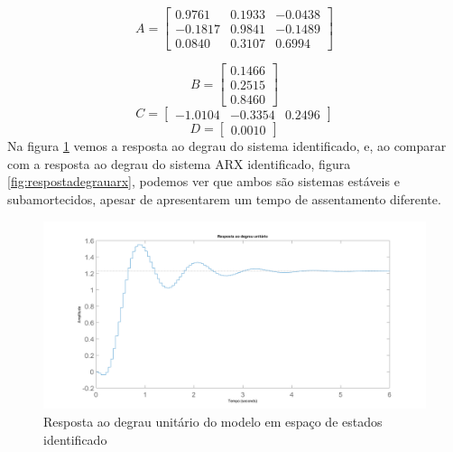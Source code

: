 \begin{equation}
A=\begin{bmatrix}
0.9761  &  0.1933 &  -0.0438\\
-0.1817  &  0.9841  & -0.1489\\
0.0840  &  0.3107  &  0.6994
\end{bmatrix}
\end{equation}

\begin{equation}
B=\begin{bmatrix}
0.1466\\
0.2515\\
0.8460
\end{bmatrix}
\end{equation}
\begin{equation}
C=\begin{bmatrix}
-1.0104 &  -0.3354 &   0.2496
\end{bmatrix}
\end{equation}
\begin{equation}
D=\begin{bmatrix}
0.0010
\end{bmatrix}
\end{equation}
Na figura \ref{fig:respostadegrausub} vemos a resposta ao degrau do sistema identificado, e, ao comparar com a resposta ao degrau do sistema ARX identificado, figura \ref{fig:respostadegrauarx}, podemos ver que ambos são sistemas estáveis e subamortecidos, apesar de apresentarem um tempo de assentamento diferente.

\begin{figure}[H]
	\centering
	\includegraphics[width=1\linewidth]{respostadegrausub}
	\caption[Resposta ao degrau do modelo em espaço de estados]{Resposta ao degrau unitário do modelo em espaço de estados identificado}
	\label{fig:respostadegrausub}
\end{figure}

